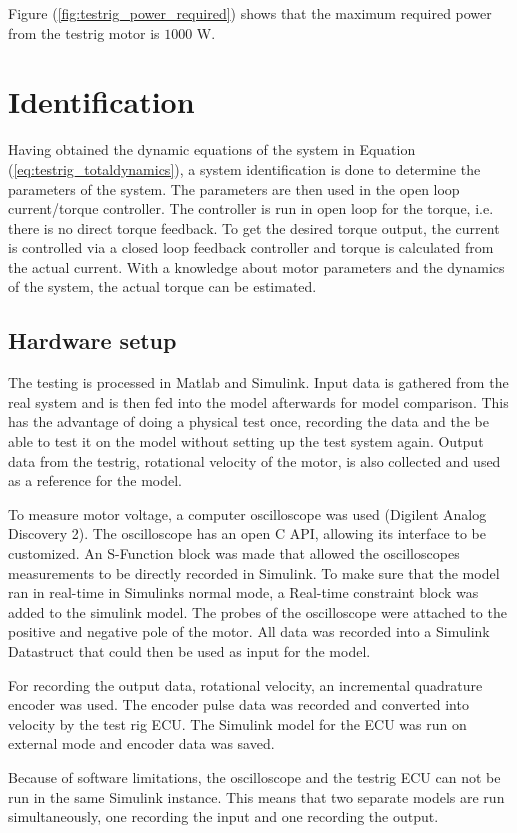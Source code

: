 Figure (\ref{fig:testrig_power_required}) shows that the maximum required power from the testrig motor is $1000$ W.

\section{Identification}
Having obtained the dynamic equations of the system in Equation
(\ref{eq:testrig_totaldynamics}), a system identification is done to determine
the parameters of the system. The parameters are then used in the open loop
current/torque controller. The controller is run in open loop for the
torque, i.e. there is no direct torque feedback. To get the desired torque
output, the current is controlled via a closed loop feedback controller and
torque is calculated from the actual current. With a knowledge about motor
parameters and the dynamics of the system, the actual torque can be estimated. 

\subsection{Hardware setup}
The testing is processed in Matlab and Simulink. Input data is gathered from the
real system and is then fed into the model afterwards for model comparison. This
has the advantage of doing a physical test once, recording the data and the be
able to test it on the model without setting up the test system again. Output
data from the testrig, rotational velocity of the motor, is also collected and
used as a reference for the model.

To measure motor voltage, a computer oscilloscope was used (Digilent Analog
Discovery 2). The oscilloscope has an open C API, allowing its interface to be
customized. An S-Function block was made that allowed the oscilloscopes
measurements to be directly recorded in Simulink. To make sure that the model
ran in real-time in Simulinks normal mode, a Real-time constraint block was
added to the simulink model. The probes of the oscilloscope were attached to
the positive and negative pole of the motor. All data was recorded into a
Simulink Datastruct that could then be used as input for the model. 

For recording the output data, rotational velocity, an incremental quadrature
encoder was used. The encoder pulse data was recorded and converted into
velocity by the test rig ECU. The Simulink model for the ECU was run on external
mode and encoder data was saved. 

Because of software limitations, the oscilloscope and the testrig ECU can not be
run in the same Simulink instance. This means that two separate models are run
simultaneously, one recording the input and one recording the output.


